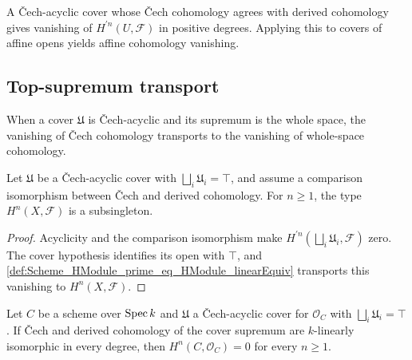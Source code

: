 A \v{C}ech-acyclic cover whose \v{C}ech cohomology agrees with derived cohomology gives vanishing of \(H^{\prime n}(U,\mathcal F)\) in positive degrees. Applying this to covers of affine opens yields affine cohomology vanishing.

\subsection{Top-supremum transport}

When a cover \(\mathfrak U\) is Čech-acyclic and its supremum is the whole space, the vanishing of Čech cohomology transports to the vanishing of whole-space cohomology.

\begin{theorem}\leanok
  \label{thm:Scheme_subsingleton_HModule_of_isCechAcyclicCover_top}

  Let \(\mathfrak U\) be a Čech-acyclic cover with \(\bigsqcup_i \mathfrak U_i = \top\), and assume a comparison isomorphism between Čech and derived cohomology. For \(n \ge 1\), the type \(H^{n}(X, \mathcal F)\) is a subsingleton.
\end{theorem}

\begin{proof}


\leanok
  Acyclicity and the comparison isomorphism make \(H^{\prime n}(\bigsqcup_i\mathfrak U_i,\mathcal F)\) zero. The cover hypothesis identifies its open with \(\top\), and \cref{def:Scheme_HModule_prime_eq_HModule_linearEquiv} transports this vanishing to \(H^n(X,\mathcal F)\).
\end{proof}

\begin{theorem}\leanok
  \label{thm:Scheme_subsingleton_HModule_of_isCechAcyclicCover_top_curve}

  Let \(C\) be a scheme over \(\operatorname{Spec} k\) and \(\mathfrak U\) a \v{C}ech-acyclic cover for \(\mathcal O_C\) with \(\bigsqcup_i\mathfrak U_i=\top\). If \v{C}ech and derived cohomology of the cover supremum are \(k\)-linearly isomorphic in every degree, then \(H^n(C,\mathcal O_C)=0\) for every \(n\geq 1\).
\end{theorem}

